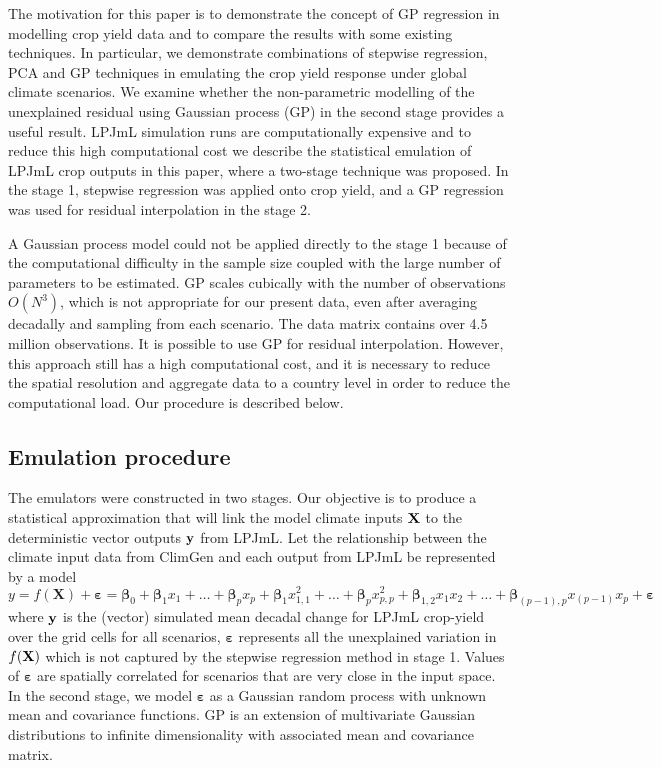 The motivation for this paper is to demonstrate the concept of GP regression in modelling crop yield data and to compare the results with some existing techniques. In particular, we demonstrate combinations of stepwise regression, PCA and GP techniques in emulating the crop yield response under global climate scenarios. We examine whether the non-parametric modelling of the unexplained residual using Gaussian process (GP) in the second stage provides a useful result. LPJmL simulation runs are computationally expensive and to reduce this high computational cost we describe the statistical emulation of LPJmL crop outputs in this paper, where a two-stage technique was proposed. In the stage 1, stepwise regression was applied onto crop yield, and a GP regression was used for residual interpolation in the stage 2. 

A Gaussian process model could not be applied directly to the stage 1 because of the computational difficulty in the sample size coupled with the large number of parameters to be estimated. GP scales cubically with the number of observations $O(N^3)$, which is not appropriate for our present data, even after averaging decadally and sampling from each scenario. The data matrix contains over 4.5 million observations. It is possible to use GP for residual interpolation. However, this approach still has a high computational cost, and it is necessary to reduce the spatial resolution and aggregate data to a country level in order to reduce the computational load. Our procedure is described below. 

\subsection{Emulation procedure}
The emulators were constructed in two stages. Our objective is to produce a statistical approximation that will link the model climate inputs $\textbf X$ to the deterministic vector outputs ${\bf y}$ from LPJmL. Let the relationship between the climate input data from ClimGen and each output from LPJmL be represented by a model
\begin{equation}\label{geneq}
y=f(\textbf{X})+\boldsymbol\varepsilon= \boldsymbol\beta_0+\boldsymbol\beta_{1}x_{1}+\ldots +\boldsymbol\beta_{p}x_{p}+ \boldsymbol\beta_{1}x_{1,1}^{2}+\ldots+\boldsymbol\beta_{p}x_{p,p}^2+\boldsymbol\beta_{1,2}x_{1}x_{2}+\dots +\boldsymbol\beta_{(p-1),p}x_{(p-1)}x_{p}+\boldsymbol\varepsilon
\end{equation}
where ${\bf y}$ is the (vector) simulated mean decadal change for LPJmL crop-yield over the grid cells for all scenarios, $\boldsymbol \varepsilon$ represents all the unexplained variation in $f(\textbf X)$ which is not captured by the stepwise regression method in stage 1. Values of $\boldsymbol \varepsilon$ are spatially correlated for scenarios that are very close in the input space. In the second stage, we model $\boldsymbol \varepsilon$ as a Gaussian random process with unknown mean and covariance functions. GP is an extension of multivariate Gaussian distributions to infinite dimensionality with associated mean and covariance matrix.

